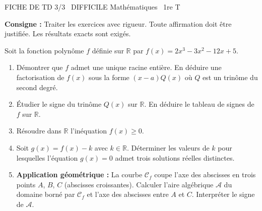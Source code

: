 \documentclass[11pt]{article}
\begin{document}
\begin{tcolorbox}[enhanced,colback=popink,colframe=popink,arc=10pt,boxrule=0pt,left=12pt,right=12pt,top=9pt,bottom=9pt]
{\color{white}\popxbold\small FICHE DE TD 3/3 \textbullet\ DIFFICILE \hfill Mathématiques \textbullet\ 1re T\par}
\end{tcolorbox}
\vspace{4pt}
\noindent\textbf{Consigne :} Traiter les exercices avec rigueur. Toute affirmation doit être justifiée. Les résultats exacts sont exigés.

\begin{exercice}
Soit la fonction polynôme $f$ définie sur $\mathbb{R}$ par $f(x)=2x^3-3x^2-12x+5$.
\begin{enumerate}
    \item Démontrer que $f$ admet une unique racine entière. En déduire une factorisation de $f(x)$ sous la forme $(x-a)Q(x)$ où $Q$ est un trinôme du second degré.
    \item Étudier le signe du trinôme $Q(x)$ sur $\mathbb{R}$. En déduire le tableau de signes de $f$ sur $\mathbb{R}$.
    \item Résoudre dans $\mathbb{R}$ l'inéquation $f(x) \geqslant 0$.
    \item Soit $g(x)=f(x)-k$ avec $k \in \mathbb{R}$. Déterminer les valeurs de $k$ pour lesquelles l'équation $g(x)=0$ admet trois solutions réelles distinctes.
    \item \textbf{Application géométrique :} La courbe $\mathcal{C}_f$ coupe l'axe des abscisses en trois points $A$, $B$, $C$ (abscisses croissantes). Calculer l'aire algébrique $\mathcal{A}$ du domaine borné par $\mathcal{C}_f$ et l'axe des abscisses entre $A$ et $C$. Interpréter le signe de $\mathcal{A}$.
\end{enumerate}
\end{exercice}
\end{document}
